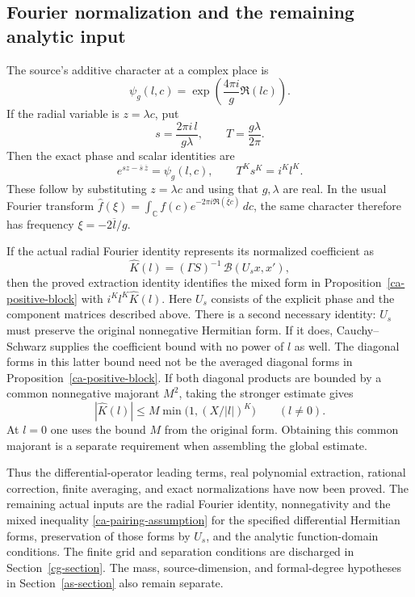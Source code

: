 \subsection{Fourier normalization and the remaining analytic input}

The source's additive character at a complex place is
\[
 \psi_g(l,c)=\exp\left(\frac{4\pi i}{g}\Re(lc)\right).
\]
If the radial variable is $z=\lambda c$, put
\[
 s=\frac{2\pi i\,l}{g\lambda},\qquad
 T=\frac{g\lambda}{2\pi}.
\]
Then the exact phase and scalar identities are
\begin{equation}\label{ca-phase}
 e^{sz-\overline s\,\overline z}=\psi_g(l,c),
 \qquad T^Ks^K=i^Kl^K.
\end{equation}
These follow by substituting $z=\lambda c$ and using that
$g,\lambda$ are real.  In the usual Fourier transform
$\widehat f(\xi)=\int_{\mathbb C}f(c)
e^{-2\pi i\Re(\overline\xi c)}\,dc$, the same character
therefore has frequency $\xi=-2\overline l/g$.

If the actual radial Fourier identity represents its
normalized coefficient as
\[
 \widehat K(l)
     =(\Gamma S)^{-1}\,
               \mathcal B(U_sx,x'),
\]
then the proved extraction identity identifies the mixed
form in Proposition~\ref{ca-positive-block} with
$i^Kl^K\widehat K(l)$.
Here $U_s$ consists of the explicit phase and the component
matrices described above.  There is a second necessary
identity: $U_s$ must preserve the original nonnegative
Hermitian form.  If it does, Cauchy--Schwarz supplies the
coefficient bound with no power of $l$ as well.
The diagonal forms in this latter bound need not be the
averaged diagonal forms in Proposition~\ref{ca-positive-block}.
If both diagonal products are bounded by a common
nonnegative majorant $M^2$, taking the stronger estimate
gives
\[
 |\widehat K(l)|\leq
       M\min\bigl(1,(X/|l|)^K\bigr)\qquad(l\ne0).
\]
At $l=0$ one uses the bound $M$ from the original form.
Obtaining this common majorant is a separate requirement
when assembling the global estimate.

Thus the differential-operator leading terms, real polynomial
extraction, rational correction, finite averaging, and exact
normalizations have now been proved.  The remaining actual
inputs are the radial Fourier identity, nonnegativity and
the mixed inequality \eqref{ca-pairing-assumption} for the
specified differential Hermitian forms, preservation of those
forms by $U_s$, and the analytic function-domain conditions.
The finite grid and separation conditions are discharged in
Section~\ref{cg-section}.  The mass,
source-dimension, and formal-degree hypotheses in
Section~\ref{as-section} also remain separate.

